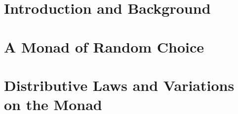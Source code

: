 \documentclass[10pt]{TUT}
\begin{document}
\section*[Acknowledgments]{}
\thispagestyle{plain}
\newpage
\pagestyle{plain}
\tableofcontents




\listoffigures
\section*[List of Figures]{}
\thispagestyle{plain}

\listoftables
\section*[List of Tables]{}
\thispagestyle{plain}


\pagestyle{headings}
\mainmatter

\chapter{Introduction and Background}\label{chap:introduction}



\chapter{A Monad of Random Choice}\label{chap:monad}
%


%

\chapter{Distributive Laws and Variations on the Monad}\label{chap:distrib}


%
\end{document}
